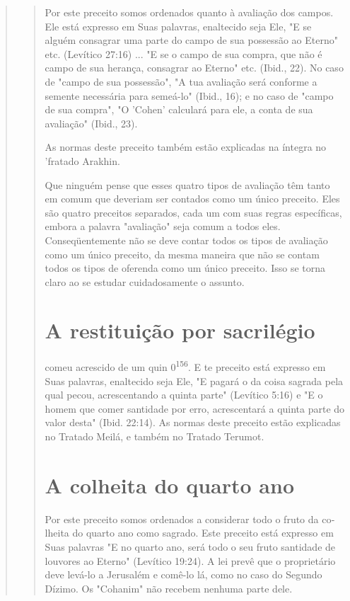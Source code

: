 \begin{quote}
\begin{quote}
Por este preceito somos ordenados quanto à avaliação dos campos. Ele
está expresso em Suas palavras, enaltecido seja Ele, "E se alguém
consagrar uma parte do campo de sua possessão ao Eterno" etc. (Levítico
27:16) ... "E se o campo de sua compra, que não é campo de sua herança,
consagrar ao Eterno" etc. (Ibid., 22). No caso de "campo de sua
possessão", "A tua avaliação será con­forme a semente necessária para
semeá-lo" (Ibid., 16); e no caso de "campo de sua compra", "O 'Cohen'
calculará para ele, a conta de sua avaliação" (Ibid., 23).

As normas deste preceito também estão explicadas na íntegra no 'fra­tado
Arakhin.

Que ninguém pense que esses quatro tipos de avaliação têm tanto em comum
que deveriam ser contados como um único preceito. Eles são qua­tro
preceitos separados, cada um com suas regras específicas, embora a
palavra "avaliação" seja comum a todos eles. Conseqüentemente não se
deve contar todos os tipos de avaliação como um único preceito, da mesma
maneira que não se contam todos os tipos de oferenda como um único
preceito. Isso se tor­na claro ao se estudar cuidadosamente o assunto.

\section{A restituição por sacrilégio}



comeu acrescido de um quin 0\textsuperscript{156}. E te preceito está
expresso em Suas palavras, enaltecido seja Ele, "E pagará o da coisa
sagrada pela qual pecou, acrescen­tando a quinta parte" (Levítico 5:16)
e "E o homem que comer santidade por er­ro, acrescentará a quinta parte
do valor desta" (Ibid. 22:14). As normas deste pre­ceito estão
explicadas no Tratado Meilá, e também no Tratado Terumot.

\section{A colheita do quarto ano}

Por este preceito somos ordenados a considerar todo o fruto da co­lheita
do quarto ano como sagrado. Este preceito está expresso em Suas
pala­vras "E no quarto ano, será todo o seu fruto santidade de louvores
ao Eterno" (Levítico 19:24). A lei prevê que o proprietário deve levá-lo
a Jerusalém e comê-lo lá, como no caso do Segundo Dízimo. Os "Cohanim"
não recebem nenhuma parte dele.


\end{quote}
\end{quote}

